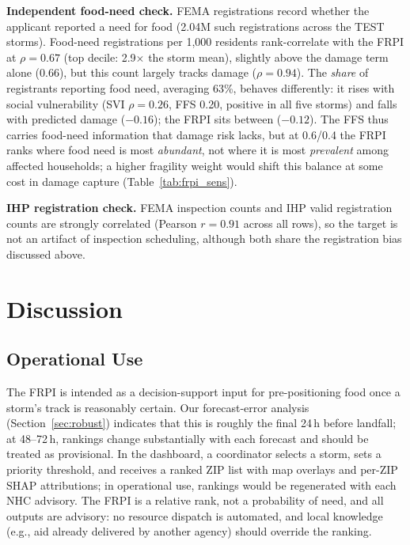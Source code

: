 \documentclass[conference]{IEEEtran}
\renewcommand{\_}{\origunderscore\allowbreak}
\begin{document}
\textbf{Independent food-need check.} FEMA registrations record
whether the applicant reported a need for food (2.04M such
registrations across the TEST storms). Food-need registrations per
1,000 residents rank-correlate with the FRPI at $\rho=0.67$ (top
decile: 2.9$\times$ the storm mean), slightly above the damage term
alone (0.66), but this count largely tracks damage ($\rho=0.94$).
The \textit{share} of registrants reporting food need, averaging
63\%, behaves differently: it rises with social vulnerability (SVI
$\rho=0.26$, FFS 0.20, positive in all five storms) and falls with
predicted damage ($-0.16$); the FRPI sits between ($-0.12$). The FFS
thus carries food-need information that damage risk lacks, but at
0.6/0.4 the FRPI ranks where food need is most \textit{abundant},
not where it is most \textit{prevalent} among affected households;
a higher fragility weight would shift this balance at some cost in
damage capture (Table~\ref{tab:frpi_sens}).

\textbf{IHP registration check.} FEMA inspection counts
and IHP valid registration counts are strongly correlated
(Pearson $r=0.91$ across all rows), so the target is not an
artifact of inspection scheduling, although both share the
registration bias discussed above.

\section{Discussion}
\label{sec:discussion}

\subsection{Operational Use}
The FRPI is intended as a decision-support input for
pre-positioning food once a storm's track is reasonably certain.
Our forecast-error analysis (Section~\ref{sec:robust}) indicates
that this is roughly the final 24\,h before landfall; at 48--72\,h,
rankings change substantially with each forecast and should be
treated as provisional. In the dashboard, a coordinator selects a
storm, sets a priority threshold, and receives a ranked ZIP list
with map overlays and per-ZIP SHAP attributions; in operational
use, rankings would be regenerated with each NHC advisory. The FRPI is a relative rank,
not a probability of need, and all outputs are advisory: no
resource dispatch is automated, and local knowledge (e.g., aid
already delivered by another agency) should override the ranking.
\end{document}
